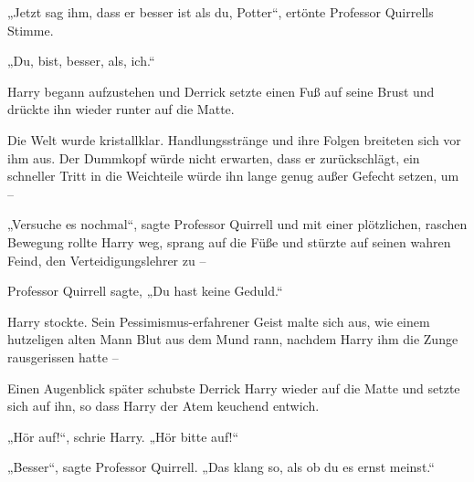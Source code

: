 „Jetzt sag ihm, dass er besser ist als du, Potter“, ertönte Professor Quirrells Stimme.

„Du, bist, besser, als, ich.“

Harry begann aufzustehen und Derrick setzte einen Fuß auf seine Brust und drückte ihn wieder runter auf die Matte.

Die Welt wurde kristallklar. Handlungsstränge und ihre Folgen breiteten sich vor ihm aus. Der Dummkopf würde nicht erwarten, dass er zurückschlägt, ein schneller Tritt in die Weichteile würde ihn lange genug außer Gefecht setzen, um –

„Versuche es nochmal“, sagte Professor Quirrell und mit einer plötzlichen, raschen Bewegung rollte Harry weg, sprang auf die Füße und stürzte auf seinen wahren Feind, den Verteidigungslehrer zu –

Professor Quirrell sagte, „Du hast keine Geduld.“

Harry stockte. Sein Pessimismus-erfahrener Geist malte sich aus, wie einem hutzeligen alten Mann Blut aus dem Mund rann, nachdem Harry ihm die Zunge rausgerissen hatte –

Einen Augenblick später schubste Derrick Harry wieder auf die Matte und setzte sich auf ihn, so dass Harry der Atem keuchend entwich.

„Hör auf!“, schrie Harry. „Hör bitte auf!“

„Besser“, sagte Professor Quirrell. „Das klang so, als ob du es ernst meinst.“

